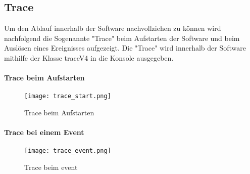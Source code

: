 \subsection{Trace} \label{trace}
Um den Ablauf innerhalb der Software nachvollziehen zu können wird nachfolgend die Sogenannte "Trace" beim Aufstarten der Software und beim Auslösen eines Ereignisses aufgezeigt. Die "Trace" wird innerhalb der Software mithilfe der Klasse traceV4 in die Konsole ausgegeben.

\paragraph{Trace beim Aufstarten}
 
 \begin{figure}[H]
	\centering
	\texttt{[image: trace\_start.png]}
	\caption{Trace beim Aufstarten}
	\label{fig:tracestart}
\end{figure} 

\newpage

\paragraph{Trace bei einem Event}

\begin{figure}[H]
	\centering
	\texttt{[image: trace\_event.png]}
	\caption{Trace beim event}
	\label{fig:traceevent}
\end{figure} 

\newpage